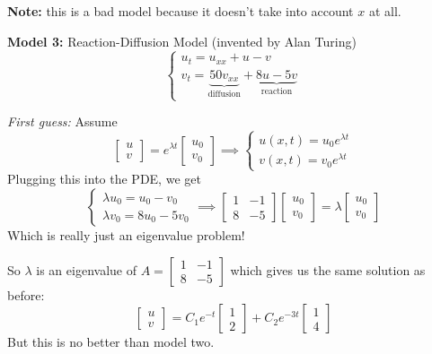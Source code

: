 \documentclass[12pt]{article}
\begin{document}
\textbf{Note:} this is a bad model because it doesn't take into account $x$ at all. 

\textbf{Model 3:} Reaction-Diffusion Model (invented by Alan Turing)
\[\begin{cases}
    u_t = u_{xx} + u - v\\
    v_t = \underbrace{50v_{xx}}_{\text{diffusion}} + \underbrace{8u - 5v}_{\text{reaction}}
\end{cases}\]

\emph{First guess:}
Assume 
\[\begin{bmatrix}
    u\\v
\end{bmatrix} = e^{\lambda t} \begin{bmatrix}
    u_0\\
    v_0
\end{bmatrix} \implies \begin{cases}
    u(x, t) = u_0 e^{\lambda t}\\
    v(x, t) = v_0e^{\lambda t}
\end{cases}\] 
Plugging this into the PDE, we get 
\[\begin{cases}
    \lambda u_0 = u_0 - v_0\\
    \lambda v_0 = 8u_0 - 5v_0
\end{cases} \implies \begin{bmatrix}
    1 & -1\\
    8 & -5  
\end{bmatrix} \begin{bmatrix}
    u_0\\v_0
\end{bmatrix} = \lambda \begin{bmatrix}
    u_0\\v_0
\end{bmatrix}\]
Which is really just an eigenvalue problem!

So $\lambda$ is an eigenvalue of $A = \begin{bmatrix}
    1 & -1\\
    8 & -5  
\end{bmatrix}$ which gives us the same solution as before:
\[\begin{bmatrix}
    u\\v
\end{bmatrix} = C_1e^{-t}\begin{bmatrix}
    1\\2
\end{bmatrix} + C_2 e^{-3t}\begin{bmatrix}
    1\\4
\end{bmatrix}\]
But this is no better than model two. 
\end{document}
